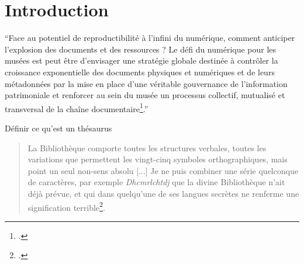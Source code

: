 \chapter{Introduction}	
\enquote{Face au potentiel de reproductibilité à l’infini du numérique, comment anticiper l’explosion des documents et des ressources ? Le défi du numérique pour les musées est peut être d’envisager une stratégie globale destinée à contrôler la croissance exponentielle des documents physiques et numériques et de leurs métadonnées par la mise en place d’une véritable gouvernance de l’information patrimoniale et renforcer au sein du musée un processus collectif, mutualisé et transversal de la chaîne documentaire\footcite{rizzaDocumentAuCoeur2014}.}


Définir ce qu'est un thésaurus
\begin{quote}
    \og La Bibliothèque comporte toutes les structures verbales, toutes les variations que permettent les vingt-cinq symboles orthographiques, mais point un seul non-sens absolu [...] Je ne puis combiner une série quelconque de caractères, par exemple	\textit{Dhcmrlchtdj} que la divine Bibliothèque n’ait déjà prévue, et qui dans quelqu'une de ses langues secrètes ne renferme
	une signification terrible\footcite{borgesBibliothequeBabel1990}.\fg
\end{quote}	
	

	



